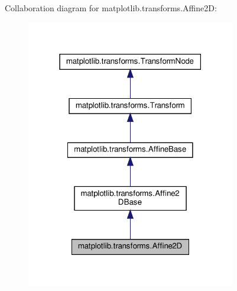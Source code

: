Collaboration diagram for matplotlib.\+transforms.\+Affine2D\+:
\nopagebreak
\begin{figure}[H]
\begin{center}
\leavevmode
\includegraphics[width=259pt]{classmatplotlib_1_1transforms_1_1Affine2D__coll__graph}
\end{center}
\end{figure}
